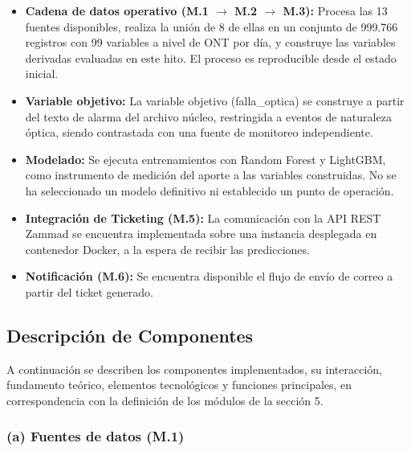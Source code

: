 \documentclass[12pt,a4paper]{article}
\begin{document}
\begin{itemize}
    \item \textbf{Cadena de datos operativo (M.1 $\rightarrow$ M.2 $\rightarrow$ M.3):} Procesa las 13 fuentes disponibles, realiza la unión de 8 de ellas en un conjunto de 999.766 registros con 99
    variables a nivel de ONT por día, y construye las variables derivadas evaluadas en este hito. El proceso es reproducible desde el estado inicial.

    \item \textbf{Variable objetivo:} La variable objetivo (falla\_optica) se construye a partir del texto de alarma del archivo núcleo, restringida a eventos de naturaleza óptica, siendo contrastada con una fuente de monitoreo independiente.
    
    \item \textbf{Modelado:} Se ejecuta entrenamientos con Random Forest y LightGBM, como instrumento de medición del aporte a las variables construidas. No se ha seleccionado un modelo definitivo ni establecido un punto de operación.
    
    \item \textbf{Integración de Ticketing (M.5):} La comunicación con la API REST Zammad se encuentra implementada sobre una instancia desplegada en contenedor Docker, a la espera de recibir las predicciones.
    
    \item \textbf{Notificación (M.6):} Se encuentra disponible el flujo de envío de correo a partir del ticket generado. 
\end{itemize}



\subsection{Descripción de Componentes}
\noindent
A continuación se describen los componentes implementados, su interacción, fundamento teórico, elementos tecnológicos y funciones principales, en correspondencia con la definición de los módulos de la sección 5.

\subsubsection*{(a) Fuentes de datos (M.1)}
 
\end{document}

